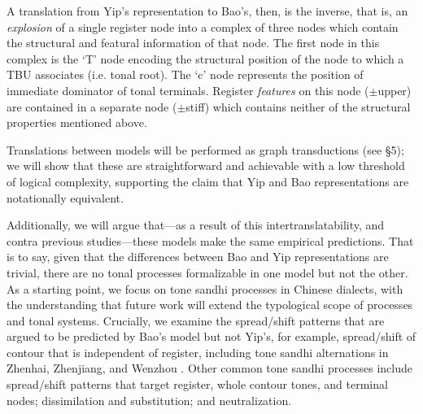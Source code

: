 \documentclass{article}
\begin{document}
A translation from Yip's representation to Bao's, then, is the inverse, that is, an \emph{explosion} of a single register node into a complex of three nodes which contain the structural and featural information of that node. The first node in this complex is the `T' node encoding the structural position of the node to which a TBU associates (i.e. tonal root). The `c' node represents the position of immediate dominator of tonal terminals. Register \emph{features} on this node ($\pm$upper) are contained in a separate node ($\pm$stiff) which contains neither of the structural properties mentioned above. 
\begin{center}
\end{center}
Translations between models will be performed as graph transductions (see \S 5); we will show that these are straightforward and achievable with a low threshold of logical complexity, supporting the claim that Yip and Bao representations are notationally equivalent.\par
Additionally, we will argue that---as a result of this intertranslatability, and contra previous studies---these models make the same empirical predictions. That is to say, given that the differences between Bao and Yip representations are trivial, there are no tonal processes formalizable in one model but not the other. As a starting point, we focus on tone sandhi processes in Chinese dialects, with the understanding that future work will extend the typological scope of processes and tonal systems. Crucially, we examine the spread/shift patterns that are argued to be predicted by Bao's model but not Yip's, for example, spread/shift of contour that is independent of register, including tone sandhi alternations in Zhenhai, Zhenjiang, and Wenzhou \citep{Bao1990, Chen2000}. Other common tone sandhi processes include spread/shift patterns that target register, whole contour tones, and terminal nodes; dissimilation and substitution; and neutralization. \par
\end{document}
